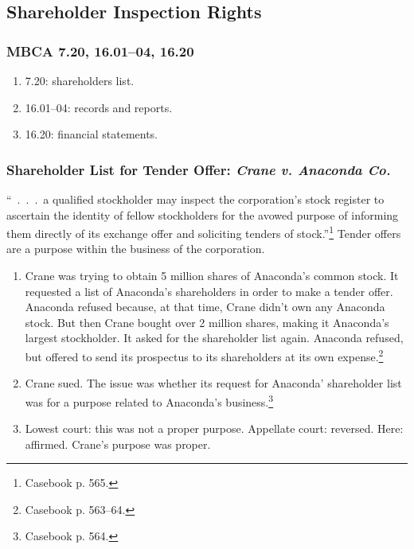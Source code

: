 \subsection{Shareholder Inspection Rights}

\subsubsection{MBCA 7.20, 16.01--04, 16.20}

\begin{enumerate}
    \item 7.20: shareholders list.
    \item 16.01--04: records and reports.
    \item 16.20: financial statements.
\end{enumerate}

\subsubsection{Shareholder List for Tender Offer: \emph{Crane v. Anaconda Co.}}

``~.~.~.~a qualified stockholder may inspect the corporation's stock register to 
ascertain the identity of fellow stockholders for the avowed purpose of 
informing them directly of its exchange offer and soliciting tenders of 
stock.''\footnote{Casebook p. 565.} Tender offers are a purpose within the 
business of the corporation.

\begin{enumerate}
    \item Crane was trying to obtain 5 million shares of Anaconda's common 
    stock. It requested a list of Anaconda's shareholders in order to make a 
    tender offer. Anaconda refused because, at that time, Crane didn't own any 
    Anaconda stock. But then Crane bought over 2 million shares, making it 
    Anaconda's largest stockholder. It asked for the shareholder list again. 
    Anaconda refused, but offered to send its prospectus to its shareholders at 
    its own expense.\footnote{Casebook p. 563--64.}
    \item Crane sued. The issue was whether its request for Anaconda' 
    shareholder list was for a purpose related to Anaconda's 
    business.\footnote{Casebook p. 564.}
    \item Lowest court: this was not a proper purpose. Appellate court: 
    reversed. Here: affirmed. Crane's purpose was proper.
\end{enumerate}


